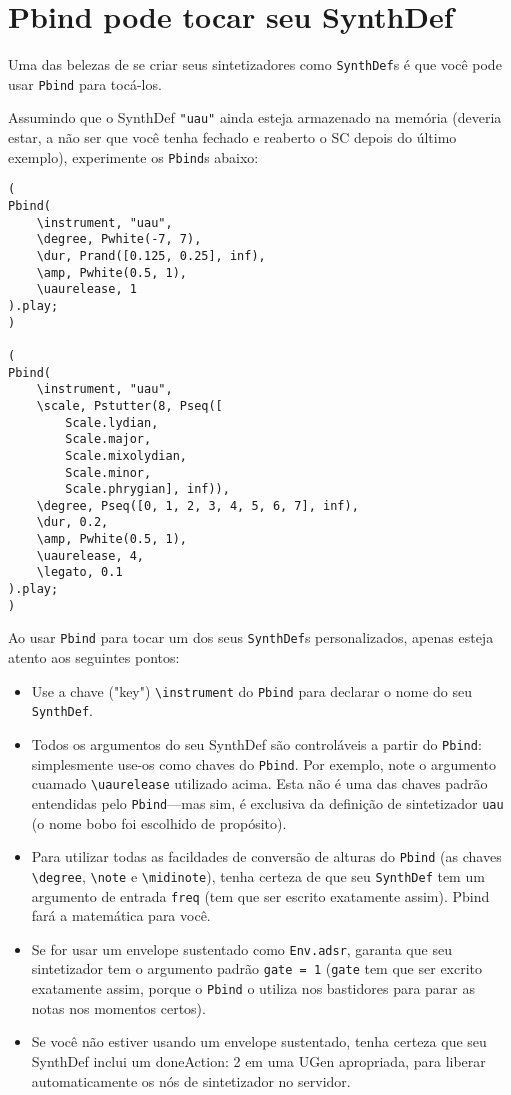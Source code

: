 \section{Pbind pode tocar seu SynthDef}

Uma das belezas de se criar seus sintetizadores como \texttt{SynthDef}s é que você pode usar \texttt{Pbind} para tocá-los.

Assumindo que o SynthDef \texttt{"uau"} ainda esteja armazenado na memória (deveria estar, a não ser que você tenha fechado e reaberto o SC depois do último exemplo), experimente os \texttt{Pbind}s abaixo:

\begin{lstlisting}[style=SuperCollider-IDE, basicstyle=\scttfamily\footnotesize]
(
Pbind(
	\instrument, "uau",
	\degree, Pwhite(-7, 7),
	\dur, Prand([0.125, 0.25], inf),
	\amp, Pwhite(0.5, 1),
	\uaurelease, 1
).play;
)

(
Pbind(
	\instrument, "uau",
	\scale, Pstutter(8, Pseq([
		Scale.lydian,
		Scale.major,
		Scale.mixolydian,
		Scale.minor,
		Scale.phrygian], inf)),
	\degree, Pseq([0, 1, 2, 3, 4, 5, 6, 7], inf),
	\dur, 0.2,
	\amp, Pwhite(0.5, 1),
	\uaurelease, 4,
	\legato, 0.1
).play;
)
\end{lstlisting}
 
Ao usar \texttt{Pbind} para tocar um dos seus \texttt{SynthDef}s personalizados, apenas esteja atento aos seguintes pontos:

\begin{itemize}
\item Use a chave ("key") \texttt{\textbackslash instrument} do \texttt{Pbind} para declarar o nome do seu \texttt{SynthDef}.
\item Todos os argumentos do seu SynthDef são controláveis a partir do \texttt{Pbind}: simplesmente use-os como chaves do \texttt{Pbind}. Por exemplo, note o argumento cuamado \texttt{\textbackslash uaurelease} utilizado acima. Esta não é uma das chaves padrão entendidas pelo \texttt{Pbind}---mas sim, é exclusiva da definição de sintetizador  \texttt{uau} (o nome bobo foi escolhido de propósito).

\item Para utilizar todas as facildades de conversão de alturas do \texttt{Pbind} (as chaves \texttt{\textbackslash degree}, \texttt{\textbackslash note} e \texttt{\textbackslash midinote}), tenha certeza de que seu \texttt{SynthDef} tem um argumento de entrada \texttt{freq} (tem que ser escrito exatamente assim). Pbind fará a matemática para você.
\item Se for usar um envelope sustentado como \texttt{Env.adsr}, garanta que seu sintetizador tem o argumento padrão \texttt{gate = 1} (\texttt{gate} tem que ser excrito exatamente assim, porque o \texttt{Pbind} o utiliza nos bastidores para parar as notas nos momentos certos).
\item Se você não estiver usando um envelope sustentado, tenha certeza que seu SynthDef inclui um doneAction: 2 em uma UGen apropriada, para liberar automaticamente os nós de sintetizador no servidor.
\end{itemize}

